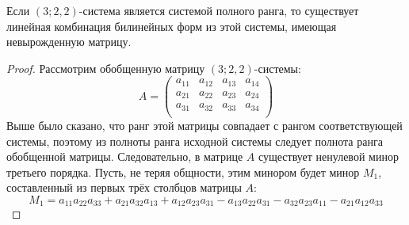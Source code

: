 \begin{lemma}
	Если $(3;2,2)$-система является системой полного ранга, то существует линейная 
	комбинация билинейных форм из этой системы, имеющая невырожденную матрицу.
\end{lemma}
\begin{proof}
	Рассмотрим обобщенную матрицу $(3;2,2)$-системы:
	$$
		A =  
	 		\begin{pmatrix}
				a_{11} & a_{12} & a_{13} & a_{14} \\
				a_{21} & a_{22} & a_{23} & a_{24} \\
				a_{31} & a_{32} & a_{33} & a_{34} \\
			\end{pmatrix}
	$$ 
	Выше было сказано, что ранг этой матрицы совпадает с рангом соответствующей системы, 
	поэтому из полноты ранга исходной системы следует полнота ранга обобщенной матрицы. 
	Следовательно, в матрице $A$  существует ненулевой минор третьего порядка. Пусть, не 
	теряя общности, этим минором будет минор $M_1$, составленный из первых трёх столбцов 
	матрицы $A$:
	$$ 
		M_1 = a_{11}a_{22}a_{33} + a_{21}a_{32}a_{13} + a_{12}a_{23}a_{31}-a_{13}a_{22}
		a_{31}-a_{32}a_{23}a_{11}-a_{21}a_{12}a_{33}
	$$
	

\end{proof}
